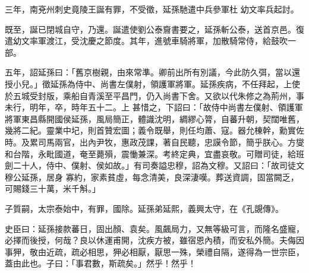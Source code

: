 \begin{pinyinscope}
 三年，南兗州刺史竟陵王誕有罪，不受徵，延孫馳遣中兵參軍杜
 幼文率兵起討。



 既至，誕已閉城自守，乃還。誕遣使劉公泰齎書要之，延孫斬公泰，送首京邑。復遣幼文率軍渡江，受沈慶之節度。其年，進號車騎將軍，加散騎常侍，給鼓吹一部。



 五年，詔延孫曰：「舊京樹親，由來常準。卿前出所有別議，今此防久弭，當以還授小兒。」徵延孫為侍中、尚書左僕射，領護軍將軍。延孫疾病，不任拜起，上使於五城受封版，乘船自青溪至平昌門，仍入尚書下舍。又欲以代朱修之為荊州，事未行，明年，卒，時年五十二。上
 甚惜之，下詔曰：「故侍中尚書左僕射、領護軍將軍東昌縣開國侯延孫，風局簡正，體識沈明，綢繆心膂，自蕃升朝，契闊唯舊，幾將二紀。靈業中圮，則首贊宏圖；義令既舉，則任均蕭、寇。器允棟幹，勳實佐時。及累司馬兩官，出內尹牧，惠政茂課，著自民聽，忠謨令節，簡乎朕心。方燮和台階，永毗國道，奄至薨殞，震慟兼深。考終定典，宜盡哀敬。可贈司徒，給班劍二十人，侍中、僕射、侯如故。」有司奏謚忠穆，詔為文穆。又詔曰：「故司徒文穆公延孫，居身
 寡約，家素貧虛，每念清美，良深淒嘆。葬送資調，固當闕乏，可賜錢三十萬，米千斛。」



 子質嗣，太宗泰始中，有罪，國除。延孫弟延熙，義興太守，在《孔覬傳》。



 史臣曰：延孫接款蕃日，固出顏、袁矣。風飆局力，又無等級可言，而隆名盛寵，必擇而後授，何哉？良以休運甫開，沈疾方被，雖宿恩內積，而安私外簡。夫侮因事狎，敬由近疏，疏必相思，狎必相厭，厭思一殊，榮禮自隔，遂得為一世宗臣，蓋由此也。子曰：「事君數，斯疏矣。」然乎！然乎！



\end{pinyinscope}